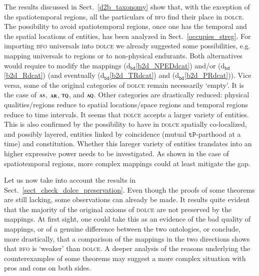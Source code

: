 \documentclass[ao]{iosart2x}
\newcommand{\bdDefLabel}{\textrm{d$_\texttt{bd}$}}
\newcommand{\refbddf}[1]{({\bdDefLabel}\ref{#1})}
\newcommand{\pr}[1]{\mathtt{#1}}
\newcommand{\dolce}{{\textsc{dolce}}}
\newcommand{\bfo}{{\textsc{bfo}}}
\newcommand {\AQdcat} {\textsc{aq}}
\newcommand {\ARdcat} {\textsc{ar}}
\newcommand {\ASdcat} {\textsc{as}}
\newcommand {\TQdcat} {\textsc{tq}}
\newcommand {\TPd} {\ensuremath{\pr{tP}}}
\begin{document}
The results discussed in Sect.~\ref{d2b_taxonomy} show that, with the exception of the spatiotemporal regions, all the particulars of {\bfo} find their place in {\dolce}. The possibility to avoid spatiotemporal regions, once one has the temporal and the spatial locations of entities, has been analyzed in Sect.~\ref{occupies_streg}. For importing {\bfo} universals into {\dolce} we already suggested some possibilities, e.g. mapping universals to regions or to non-physical endurants. Both alternatives would require to modify the mappings \refbddf{b2d_NPEDdcat} and/or  \refbddf{b2d_Rdcat} (and eventually \refbddf{b2d_TRdcat} and \refbddf{b2d_PRdcat}). Vice versa, some of the original categories of {\dolce} remain necessarily `empty'. It is the case of $\ASdcat$, $\ARdcat$, $\TQdcat$, and $\AQdcat$. Other categories are drastically reduced: physical qualities/regions reduce to spatial locations/space regions and temporal regions reduce to time intervals. It seems that {\dolce} accepts a larger variety of entities. This is also confirmed by the possibility to have in {\dolce} spatially co-localized, and possibly layered, entities linked by coincidence (mutual $\TPd$-parthood at a time) and constitution. Whether this lareger variety of entities translates into an higher expressive power needs to be investigated. As shown in the case of spatiotemporal regions, more complex mappings could at least mitigate the gap.

Let us now take into account the results in Sect.~\ref{sect_check_dolce_preservation}. Even though the proofs of some theorems are still lacking, some observations can already be made. It results quite evident that the majority of the original axioms of {\dolce} are not preserved by the mappings. At first sight, one could take this as an evidence of the bad quality of mappings, or of a genuine difference between the two ontologies, or conclude, more drastically, that a comparison of the mappings in the two directions shows that {\bfo} is `weaker' than {\dolce}. A deeper analysis of the reasons underlying the counterexamples of some theorems may suggest a more complex situation with pros and cons on both sides.  
\end{document}
